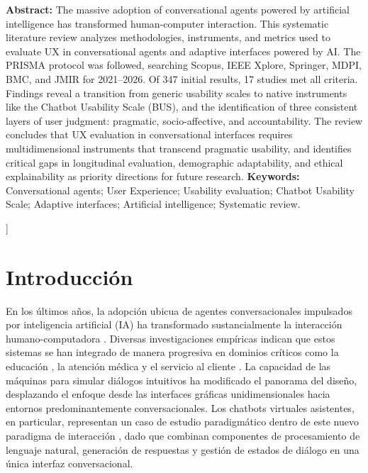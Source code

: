 \documentclass[11pt,twocolumn]{article}
\begin{document}
\begin{@twocolumnfalse}
\vspace{0.5cm}

\noindent\textbf{Abstract:}
The massive adoption of conversational agents powered by artificial intelligence has transformed human-computer interaction. This systematic literature review analyzes methodologies, instruments, and metrics used to evaluate UX in conversational agents and adaptive interfaces powered by AI. The PRISMA protocol was followed, searching Scopus, IEEE Xplore, Springer, MDPI, BMC, and JMIR for 2021--2026. Of 347 initial results, 17 studies met all criteria. Findings reveal a transition from generic usability scales to native instruments like the Chatbot Usability Scale (BUS), and the identification of three consistent layers of user judgment: pragmatic, socio-affective, and accountability. The review concludes that UX evaluation in conversational interfaces requires multidimensional instruments that transcend pragmatic usability, and identifies critical gaps in longitudinal evaluation, demographic adaptability, and ethical explainability as priority directions for future research.
\vspace{0.3cm}
\noindent\textbf{Keywords:} Conversational agents; User Experience; Usability evaluation; Chatbot Usability Scale; Adaptive interfaces; Artificial intelligence; Systematic review.
\vspace{0.4cm}
\end{@twocolumnfalse}
]

\section{Introducción}

En los últimos años, la adopción ubicua de agentes conversacionales impulsados por inteligencia artificial (IA) ha transformado sustancialmente la interacción humano-computadora \cite{folstad2021}. Diversas investigaciones empíricas indican que estos sistemas se han integrado de manera progresiva en dominios críticos como la educación \cite{kuhail2022, belda2023}, la atención médica \cite{he2022, fan2023, chung2021} y el servicio al cliente \cite{jannach2022}. La capacidad de las máquinas para simular diálogos intuitivos ha modificado el panorama del diseño, desplazando el enfoque desde las interfaces gráficas unidimensionales hacia entornos predominantemente conversacionales. Los chatbots virtuales asistentes, en particular, representan un caso de estudio paradigmático dentro de este nuevo paradigma de interacción \cite{folstad2021}, dado que combinan componentes de procesamiento de lenguaje natural, generación de respuestas y gestión de estados de diálogo en una única interfaz conversacional.
\end{document}
